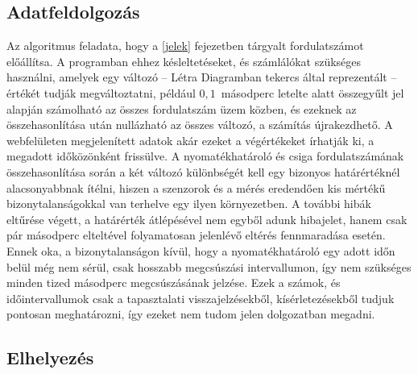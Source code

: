 \subsection{Adatfeldolgozás}
Az algoritmus feladata, hogy a \ref{jelek} fejezetben tárgyalt fordulatszámot előállítsa. A programban ehhez késleltetéseket, és számlálókat szükséges használni, amelyek egy változó -- Létra Diagramban tekercs által reprezentált -- értékét tudják megváltoztatni, például $0,1$~másodperc letelte alatt összegyűlt jel alapján számolható az összes fordulatszám üzem közben, és ezeknek az összehasonlítása után nullázható az összes változó, a számítás újrakezdhető. A webfelületen megjelenített adatok akár ezeket a végértékeket írhatják ki, a megadott időközönként frissülve. A nyomatékhatároló és csiga fordulatszámának összehasonlítása során a két változó különbségét kell egy bizonyos határértéknél alacsonyabbnak ítélni, hiszen a szenzorok és a mérés eredendően kis mértékű bizonytalanságokkal van terhelve egy ilyen környezetben. A további hibák eltűrése végett, a határérték átlépésével nem egyből adunk hibajelet, hanem csak pár másodperc elteltével folyamatosan jelenlévő eltérés fennmaradása esetén. Ennek oka, a bizonytalanságon kívül, hogy a nyomatékhatároló egy adott időn belül még nem sérül, csak hosszabb megcsúszási intervallumon, így nem szükséges minden tized másodperc megcsúszásának jelzése. Ezek a számok, és időintervallumok csak a tapasztalati visszajelzésekből, kísérletezésekből tudjuk pontosan meghatározni, így ezeket nem tudom jelen dolgozatban megadni.

\subsection{Elhelyezés}

